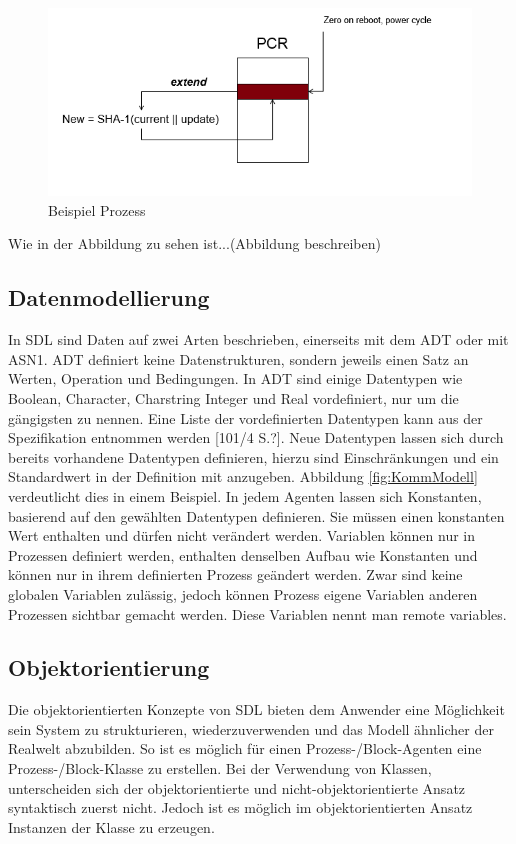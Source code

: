 \begin{figure}[ht]
	\centering
	\includegraphics[width=1\textwidth]{test.png}
	\caption{Beispiel Prozess}
	\label{fig:BspProzess}
\end{figure}

Wie in der Abbildung zu sehen ist...(Abbildung beschreiben)

\subsection{Datenmodellierung}
\label{ssc:Daten}
In \ac{SDL} sind Daten auf zwei Arten beschrieben, einerseits mit dem \acs{ADT} oder mit \ac{ASN1}. \ac{ADT} definiert keine Datenstrukturen, sondern jeweils einen Satz an Werten, Operation und Bedingungen. In \ac{ADT} sind einige Datentypen wie Boolean, Character, Charstring Integer und Real vordefiniert, nur um die gängigsten zu nennen. Eine Liste der vordefinierten Datentypen kann aus der Spezifikation entnommen werden [101/4 S.?]. Neue Datentypen lassen sich durch bereits vorhandene Datentypen definieren, hierzu sind Einschränkungen und ein Standardwert in der Definition mit anzugeben. Abbildung \ref{fig:KommModell} verdeutlicht dies in einem Beispiel. In jedem Agenten lassen sich Konstanten, basierend auf den gewählten Datentypen definieren. Sie müssen einen konstanten Wert enthalten und dürfen nicht verändert werden. Variablen können nur in Prozessen definiert werden, enthalten denselben Aufbau wie Konstanten und können nur in ihrem definierten Prozess geändert werden. Zwar sind keine globalen Variablen zulässig, jedoch können Prozess eigene Variablen anderen Prozessen sichtbar gemacht werden. Diese Variablen nennt man remote variables.

\subsection{Objektorientierung} 
\label{ssc:Vererbung}
Die objektorientierten Konzepte von \ac{SDL} bieten dem Anwender eine Möglichkeit sein System zu strukturieren, wiederzuverwenden und das Modell ähnlicher der Realwelt abzubilden. So ist es möglich für einen Prozess-/Block-Agenten eine Prozess-/Block-Klasse zu erstellen.
Bei der Verwendung von Klassen, unterscheiden sich der objektorientierte und nicht-objektorientierte Ansatz syntaktisch zuerst nicht. Jedoch ist es möglich im objektorientierten Ansatz Instanzen der Klasse zu erzeugen.

